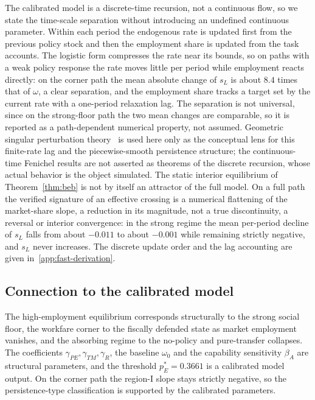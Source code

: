 \documentclass[review,12pt]{elsarticle}
\theoremstyle{plain}
\theoremstyle{definition}
\theoremstyle{remark}
\begin{document}
The calibrated model is a discrete-time recursion, not a continuous flow, so we state the time-scale separation without introducing an undefined continuous parameter. Within each period the endogenous rate is updated first from the previous policy stock and then the employment share is updated from the task accounts. The logistic form compresses the rate near its bounds, so on paths with a weak policy response the rate moves little per period while employment reacts directly: on the corner path the mean absolute change of $s_L$ is about $8.4$ times that of $\omega$, a clear separation, and the employment share tracks a target set by the current rate with a one-period relaxation lag. The separation is not universal, since on the strong-floor path the two mean changes are comparable, so it is reported as a path-dependent numerical property, not assumed. Geometric singular perturbation theory~\citep{Fenichel1979} is used here only as the conceptual lens for this finite-rate lag and the piecewise-smooth persistence structure; the continuous-time Fenichel results are not asserted as theorems of the discrete recursion, whose actual behavior is the object simulated. The static interior equilibrium of Theorem~\ref{thm:beb} is not by itself an attractor of the full model. On a full path the verified signature of an effective crossing is a numerical flattening of the market-share slope, a reduction in its magnitude, not a true discontinuity, a reversal or interior convergence: in the strong regime the mean per-period decline of $s_L$ falls from about $-0.011$ to about $-0.001$ while remaining strictly negative, and $s_L$ never increases. The discrete update order and the lag accounting are given in~\ref{app:fast-derivation}.

\subsection{Connection to the calibrated model}
\label{subsec:connection}
The high-employment equilibrium corresponds structurally to the strong social floor, the workfare corner to the fiscally defended state as market employment vanishes, and the absorbing regime to the no-policy and pure-transfer collapses. The coefficients $\gamma_{PE},\gamma_{TM},\gamma_R$, the baseline $\omega_0$ and the capability sensitivity $\beta_A$ are structural parameters, and the threshold $p_E^{*}=0.3661$ is a calibrated model output. On the corner path the region-I slope stays strictly negative, so the persistence-type classification is supported by the calibrated parameters.
\end{document}
